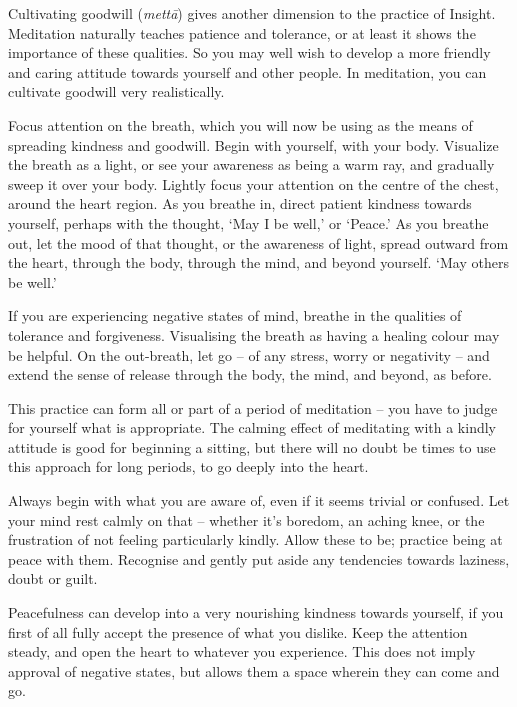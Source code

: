 
Cultivating goodwill (\textit{mettā}) gives another dimension to the practice of
Insight. Meditation naturally teaches patience and tolerance, or at
least it shows the importance of these qualities. So you may well wish
to develop a more friendly and caring attitude towards yourself and
other people. In meditation, you can cultivate goodwill very
realistically.

Focus attention on the breath, which you will now be using as the means
of spreading kindness and goodwill. Begin with yourself, with your body.
Visualize the breath as a light, or see your awareness as being a warm
ray, and gradually sweep it over your body. Lightly focus your attention
on the centre of the chest, around the heart region. As you breathe in,
direct patient kindness towards yourself, perhaps with the thought, `May
I be well,' or `Peace.' As you breathe out, let the mood of that
thought, or the awareness of light, spread outward from the heart,
through the body, through the mind, and beyond yourself. `May others be
well.'

If you are experiencing negative states of mind, breathe in the
qualities of tolerance and forgiveness. Visualising the breath as having
a healing colour may be helpful. On the out-breath, let go -- of any
stress, worry or negativity -- and extend the sense of release through
the body, the mind, and beyond, as before.

This practice can form all or part of a period of meditation -- you have
to judge for yourself what is appropriate. The calming effect of
meditating with a kindly attitude is good for beginning a sitting, but
there will no doubt be times to use this approach for long periods, to
go deeply into the heart.

Always begin with what you are aware of, even if it seems trivial or
confused. Let your mind rest calmly on that -- whether it's boredom, an
aching knee, or the frustration of not feeling particularly kindly.
Allow these to be; practice being at peace with them. Recognise and
gently put aside any tendencies towards laziness, doubt or guilt.

Peacefulness can develop into a very nourishing kindness towards
yourself, if you first of all fully accept the presence of what you
dislike. Keep the attention steady, and open the heart to whatever you
experience. This does not imply approval of negative states, but allows
them a space wherein they can come and go.

